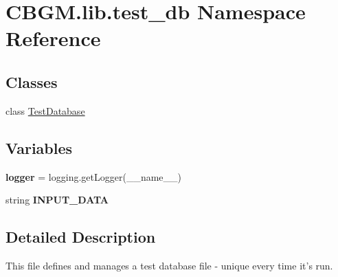 \hypertarget{namespaceCBGM_1_1lib_1_1test__db}{}\section{C\+B\+G\+M.\+lib.\+test\+\_\+db Namespace Reference}
\label{namespaceCBGM_1_1lib_1_1test__db}
\subsection*{Classes}
\begin{DoxyCompactItemize}
\item 
class \hyperlink{classCBGM_1_1lib_1_1test__db_1_1TestDatabase}{Test\+Database}
\end{DoxyCompactItemize}
\subsection*{Variables}
\begin{DoxyCompactItemize}
\item 
\mbox{\label{namespaceCBGM_1_1lib_1_1test__db_a02da78801683b085eabf7930a7d8bcd8}} 
{\bfseries logger} = logging.\+get\+Logger(\+\_\+\+\_\+name\+\_\+\+\_\+)
\item 
\mbox{\label{namespaceCBGM_1_1lib_1_1test__db_a30ed8cb8a0944bfb5da9d6ee4f175bc3}} 
string {\bfseries I\+N\+P\+U\+T\+\_\+\+D\+A\+TA}
\end{DoxyCompactItemize}


\subsection{Detailed Description}
\begin{DoxyVerb}This file defines and manages a test database file - unique every time it's run.
\end{DoxyVerb}
 